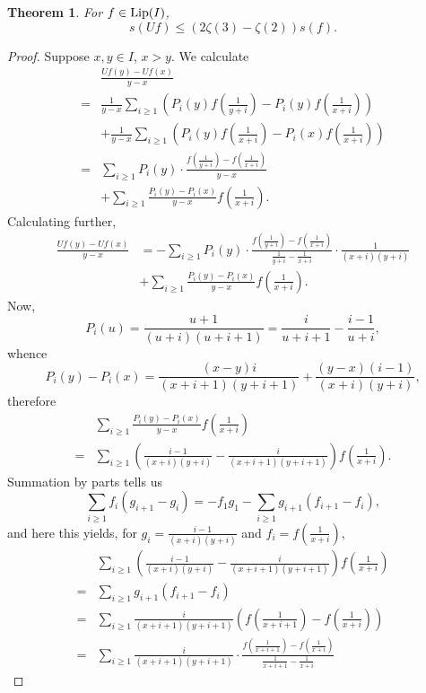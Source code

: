 \documentclass{article}
\newcommand{\Lip}{\ensuremath\mathrm{Lip}}
\newtheorem{theorem}{Theorem}
\theoremstyle{definition}
\begin{document}
\begin{theorem}
For $f \in \Lip(I)$,
\[
s(Uf) \leq (2\zeta(3)-\zeta(2)) s(f).
\]
\end{theorem}
\begin{proof}
Suppose $x,y \in I$, $x > y$. We calculate
\[
\begin{split}
&\frac{Uf(y)-Uf(x)}{y-x}\\
=&\frac{1}{y-x} \sum_{i \geq 1} \left(P_i(y) f\left(\frac{1}{y+i}\right) -P_i(y) f\left(\frac{1}{x+i}\right)\right)\\
& +\frac{1}{y-x} \sum_{i \geq 1} \left( P_i(y) f\left(\frac{1}{x+i}\right) -  P_i(x) f\left(\frac{1}{x+i}\right)\right)\\
=&\sum_{i \geq 1} P_i(y) \cdot \frac{f\left(\frac{1}{y+i}\right) - f\left(\frac{1}{x+i} \right)}{y-x}\\
&+\sum_{i \geq 1} \frac{P_i(y)-P_i(x)}{y-x} f\left(\frac{1}{x+i}\right).
\end{split}
\]
Calculating further,
\begin{align*}
\frac{Uf(y)-Uf(x)}{y-x}&=-\sum_{i \geq 1} P_i(y) \cdot \frac{f\left(\frac{1}{y+i}\right) - f\left(\frac{1}{x+i} \right)}{\frac{1}{y+i}-\frac{1}{x+i}}
\cdot \frac{1}{(x+i)(y+i)}\\
&+\sum_{i \geq 1} \frac{P_i(y)-P_i(x)}{y-x} f\left(\frac{1}{x+i}\right).
\end{align*}
Now, 
\[
P_i(u) =\frac{u+1}{(u+i)(u+i+1)}= \frac{i}{u+i+1}-\frac{i-1}{u+i},
\]
whence 
\[
P_i(y)-P_i(x)=\frac{(x-y)i}{(x+i+1)(y+i+1)} + \frac{(y-x)(i-1)}{(x+i)(y+i)},
\]
therefore
\[
\begin{split}
&\sum_{i \geq 1} \frac{P_i(y)-P_i(x)}{y-x} f\left(\frac{1}{x+i}\right)\\
=&\sum_{i \geq 1} \left(\frac{i-1}{(x+i)(y+i)}
-\frac{i}{(x+i+1)(y+i+1)}\right)f\left(\frac{1}{x+i}\right).
\end{split}
\]
Summation by parts tells us
\[
\sum_{i \geq 1} f_i(g_{i+1}-g_i) = - f_1 g_1 - \sum_{i \geq 1} g_{i+1}(f_{i+1}-f_i),
\]
and here this yields, for $g_i=\frac{i-1}{(x+i)(y+i)}$ and $f_i = f\left(\frac{1}{x+i}\right)$,
\[
\begin{split}
&\sum_{i \geq 1} \left(\frac{i-1}{(x+i)(y+i)}
-\frac{i}{(x+i+1)(y+i+1)}\right)f\left(\frac{1}{x+i}\right)\\
=&\sum_{i \geq 1} g_{i+1}(f_{i+1}-f_i)\\
=&\sum_{i \geq 1} \frac{i}{(x+i+1)(y+i+1)} \left( f \left(\frac{1}{x+i+1}\right) - f \left( \frac{1}{x+i} \right) \right)\\
=&\sum_{i \geq 1} \frac{i}{(x+i+1)(y+i+1)} \cdot \frac{ f \left(\frac{1}{x+i+1}\right) - f \left( \frac{1}{x+i} \right)}{\frac{1}{x+i+1}-\frac{1}{x+i}}

\end{split}\]
\end{proof}
\end{document}
